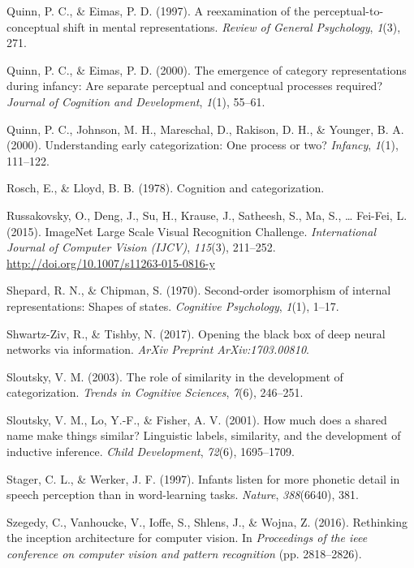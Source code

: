 \documentclass[10pt, letterpaper]{article}
\begin{document}
\hypertarget{ref-quinn1997reexamination}{}
Quinn, P. C., \& Eimas, P. D. (1997). A reexamination of the
perceptual-to-conceptual shift in mental representations. \emph{Review
of General Psychology}, \emph{1}(3), 271.

\hypertarget{ref-quinn2000emergence}{}
Quinn, P. C., \& Eimas, P. D. (2000). The emergence of category
representations during infancy: Are separate perceptual and conceptual
processes required? \emph{Journal of Cognition and Development},
\emph{1}(1), 55--61.

\hypertarget{ref-quinn2000understanding}{}
Quinn, P. C., Johnson, M. H., Mareschal, D., Rakison, D. H., \& Younger,
B. A. (2000). Understanding early categorization: One process or two?
\emph{Infancy}, \emph{1}(1), 111--122.

\hypertarget{ref-rosch1978cognition}{}
Rosch, E., \& Lloyd, B. B. (1978). Cognition and categorization.

\hypertarget{ref-ILSVRC15}{}
Russakovsky, O., Deng, J., Su, H., Krause, J., Satheesh, S., Ma, S.,
\ldots{} Fei-Fei, L. (2015). ImageNet Large Scale Visual Recognition
Challenge. \emph{International Journal of Computer Vision (IJCV)},
\emph{115}(3), 211--252. \url{http://doi.org/10.1007/s11263-015-0816-y}

\hypertarget{ref-shepard1970second}{}
Shepard, R. N., \& Chipman, S. (1970). Second-order isomorphism of
internal representations: Shapes of states. \emph{Cognitive Psychology},
\emph{1}(1), 1--17.

\hypertarget{ref-shwartz2017opening}{}
Shwartz-Ziv, R., \& Tishby, N. (2017). Opening the black box of deep
neural networks via information. \emph{ArXiv Preprint ArXiv:1703.00810}.

\hypertarget{ref-sloutsky2003role}{}
Sloutsky, V. M. (2003). The role of similarity in the development of
categorization. \emph{Trends in Cognitive Sciences}, \emph{7}(6),
246--251.

\hypertarget{ref-sloutsky2001much}{}
Sloutsky, V. M., Lo, Y.-F., \& Fisher, A. V. (2001). How much does a
shared name make things similar? Linguistic labels, similarity, and the
development of inductive inference. \emph{Child Development},
\emph{72}(6), 1695--1709.

\hypertarget{ref-stager1997infants}{}
Stager, C. L., \& Werker, J. F. (1997). Infants listen for more phonetic
detail in speech perception than in word-learning tasks. \emph{Nature},
\emph{388}(6640), 381.

\hypertarget{ref-szegedy2016rethinking}{}
Szegedy, C., Vanhoucke, V., Ioffe, S., Shlens, J., \& Wojna, Z. (2016).
Rethinking the inception architecture for computer vision. In
\emph{Proceedings of the ieee conference on computer vision and pattern
recognition} (pp. 2818--2826).
\end{document}
